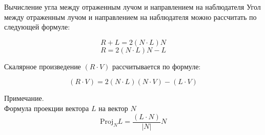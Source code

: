 \documentclass{beamer}
\begin{document}
	\begin{frame}{Вычисление угла между отраженным лучом и направлением на наблюдателя}
		Угол между отраженным лучом и направлением на наблюдателя можно рассчитать по следующей формуле:

		\[
			R + L=2(N \cdot L) N	
		\]
		\[
			R = 2 (N \cdot L) N - L
		\]

		Скалярное произведение $(R \cdot V)$ рассчитывается по формуле:

		\[
			(R \cdot V) =2({N}\cdot{L})({N}\cdot{V})-({L}\cdot{V})
		\]

		\footnotesize
		Примечание.\\
		Формула проекции вектора $L$ на вектор $N$
		\[
			\text{Proj}_{N} L = \frac{(L \cdot N)}{\lvert N \rvert} N
		\]



	\end{frame}
\end{document}
